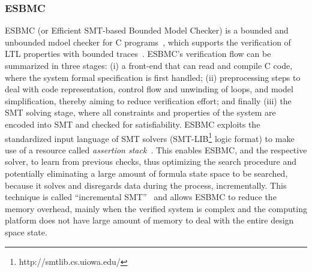 \documentclass[review]{elsarticle}
\begin{document}
\subsubsection{ESBMC}
ESBMC (or Efficient SMT-based Bounded Model Checker) is a bounded and unbounded mdoel checker for C programs~\cite{esbmc2018}, which supports the verification of LTL properties with bounded traces~\cite{DBLP:journals/sosym/MorseCN015}. ESBMC's verification flow can be summarized in three stages: (i) a front-end that can read and compile C code, where the system formal specification is first handled; (ii) preprocessing steps to deal with code representation, control flow and unwinding of loops, and model simplification, thereby aiming to reduce verification effort; and finally (iii) the SMT solving stage, where all constraints and properties of the system are encoded into SMT and checked for satisfiability. ESBMC exploits the standardized input language of SMT solvers (SMT-LIB\footnote{http://smtlib.cs.uiowa.edu/} logic format) to make use of a resource called \textit{assertion stack}~\cite{Morse2015}. This enables ESBMC, and the respective solver, to learn from previous checks, thus optimizing the search procedure and potentially eliminating a large amount of formula state space to be searched, because it solves and disregards data during the process, incrementally. This technique is called ``incremental SMT''~\cite{DBLP:journals/fac/SchrammelKBMTB17} and allows ESBMC to reduce the memory overhead, mainly when the verified system is complex and the computing platform does not have large amount of memory to deal with the entire design space state.

\end{document}
